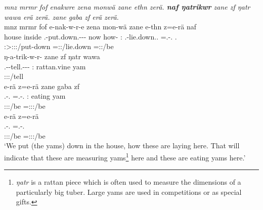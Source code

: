 \begin{exe}
	\ex \emph{mnz mrmr fof enakwre zena monwä zane ethn zerä. \textbf{naf ŋatrikwr} zane zf ŋatr wawa erä zerä. zane gaba zf erä zerä.}\\
	\glll mnz mrmr fof e-nak-w-r-e zena mon-wä zane e-thn z=e-rä naf\\
	house inside \Emph{} \Stnsg.\Alph-put.down.\Ext-\Ndu-\Lk-\Fnsg{} now how-\Emph{} \Dem:\Prox{} \Stnsg.\Alph-lie.down.\Ext.\Ndu{} \Prox=\Stnsg.\Alph-\Cop.\Ndu{} \Tsg.\Erg{}\\
	{} {} {} \footnotesize{\Fpl:\Sbj>\Stpl:\Obj:\Nonpast{}:\Ipfv/put-down} {} {} {} \footnotesize{\Prox=\Stpl:\Nonpast{}:\Ipfv/lie.down} \footnotesize{\Prox=\Stpl:\Nonpast{}:\Ipfv/be} {}\\
	\sn
	\glll ŋ-a-trik-w-r-\Zero{} zane zf ŋatr wawa\\
	\M.\Alph-\Vc-tell.\Ext-\Ndu-\Lk-\Stsg{} \Dem:\Prox{} \Imm{} rattan.vine yam\\
	\footnotesize{\Stsg:\Sbj:\Nonpast:\Ipfv/tell} {} {} {} {}\\
	\sn
	\glll e-rä z=e-rä zane gaba zf\\
	\Stnsg.\Alph-\Cop.\Ndu{} \Prox=\Stnsg.\Alph-\Cop.\Ndu{} \Dem:\Prox{} {eating yam} \Imm{}\\
	\footnotesize{\Stpl:\Sbj:\Nonpast{}:\Ipfv/be} \footnotesize{\Prox=\Stpl:\Sbj:\Nonpast{}:\Ipfv/be} {} {} {}\\
	\sn
	\glll e-rä z=e-rä\\
	\Stnsg.\Alph-\Cop.\Ndu{} \Prox=\Stnsg.\Alph-\Cop.\Ndu{}\\
	\footnotesize{\Stpl:\Sbj:\Nonpast{}:\Ipfv/be} \footnotesize{\Prox=\Stpl:\Sbj:\Nonpast{}:\Ipfv/be}\\
	\trans `We put (the yams) down in the house, how these are laying here. That will indicate that these are measuring yams\footnote{\emph{ŋatr} is a rattan piece which is often used to measure the dimensions of a particularly big tuber. Large yams are used in competitions or as special gifts.} here and these are eating yams here.'\\ 
	\label{ex167}
\end{exe}

